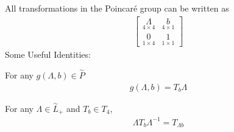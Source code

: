 \documentclass[compress,aspectratio=169,10pt,usenames,dvipsnames]{beamer}
\begin{document}
\begin{frame}
\vfill
All transformations in the Poincar\'e group can be written as
\begin{equation}
\begin{aligned}
\begin{bmatrix}
	\underset{4\times 4}{\Lambda} & \underset{4\times 1}{b}\\
	\underset{1\times 4}{0} & \underset{1\times 1}{1}
\end{bmatrix}
\end{aligned}
\end{equation}
\vfill
Some Useful Identities:
\vfill
\begin{theorem}
For any $g(\Lambda,b)\in\overset{\sim}{P}$
\begin{equation}
\begin{aligned}
g(\Lambda,b)=T_b\Lambda
 \end{aligned}
\end{equation}
\end{theorem}
\vfill
\begin{theorem}
For any $\Lambda \in\overset{\sim}{L}_+$ and $T_b\in T_4$,
\begin{equation}
\begin{aligned}
	\Lambda T_b \Lambda^{-1} = T_{\Lambda b}
\end{aligned}
\end{equation}
\end{theorem}
\end{frame}
%
%
\end{document}
